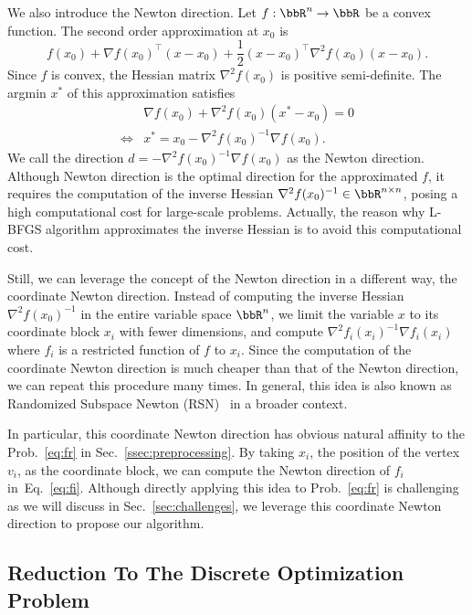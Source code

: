 \documentclass[dvipdfmx,10pt,journal,compsoc]{IEEEtran}
\begin{document}
We also introduce the Newton direction.
Let $f: \bbR^n \to \bbR$ be a convex function.
The second order approximation at $x_0$ is
\begin{equation*}
  f(x_0) + \nabla f(x_0)^\top (x - x_0) + \frac{1}{2} (x - x_0)^\top \nabla^2 f(x_0) (x - x_0).
\end{equation*}
Since $f$ is convex, the Hessian matrix $\nabla^2 f(x_0)$ is positive semi-definite.
The argmin $x^*$ of this approximation satisfies
\begin{align*}
       & \nabla f(x_0) + \nabla^2 f(x_0) (x^* - x_0) = 0 \\
  \iff & x^* = x_0 - \nabla^2 f(x_0)^{-1} \nabla f(x_0).
\end{align*}
We call the direction $d = -\nabla^2 f(x_0)^{-1} \nabla f(x_0)$ as the Newton direction.
Although Newton direction is the optimal direction for the approximated $f$, it requires the computation of the inverse Hessian $\nabla^2 f(x_0)^{-1} \in \bbR^{n \times n}$, posing a high computational cost for large-scale problems. Actually, the reason why L-BFGS algorithm approximates the inverse Hessian is to avoid this computational cost.

Still, we can leverage the concept of the Newton direction in a different way, the coordinate Newton direction.
Instead of computing the inverse Hessian $\nabla^2 f(x_0)^{-1}$ in the entire variable space $\bbR^n$, we limit the variable $x$ to its coordinate block $x_i$ with fewer dimensions, and compute $\nabla^2 f_i(x_i)^{-1} \nabla f_i(x_i)$ where $f_i$ is a restricted function of $f$ to $x_i$.
Since the computation of the coordinate Newton direction is much cheaper than that of the Newton direction, we can repeat this procedure many times.
In general, this idea is also known as Randomized Subspace Newton (RSN)~\cite{NEURIPS2019_bc6dc48b} in a broader context.

In particular, this coordinate Newton direction has obvious natural affinity to the Prob.~\eqref{eq:fr} in Sec.~\ref{ssec:preprocessing}.
By taking $x_i$, the position of the vertex $v_i$, as the coordinate block, we can compute the Newton direction of $f_i$ in~Eq.~\eqref{eq:fi}.
Although directly applying this idea to Prob.~\eqref{eq:fr} is challenging as we will discuss in Sec.~\ref{sec:challenges}, we leverage this coordinate Newton direction to propose our algorithm.

\subsection{Reduction To The Discrete Optimization Problem}\label{ssec:reduction}
\end{document}
